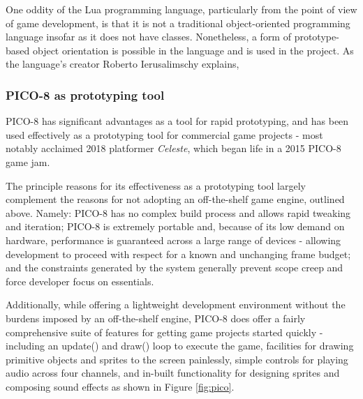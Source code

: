 \documentclass[11pt]{article}
\begin{document}
One oddity of the Lua programming language, particularly from the point of view of
game development, is that it is not a traditional object-oriented programming language
insofar as it does not have classes. Nonetheless, a form of prototype-based object orientation
is possible in the language and is used in the project. As the language's creator Roberto Ierusalimschy
explains\cite[p. 151]{ierusalimschy}, 

\subsubsection*{PICO-8 as prototyping tool}

PICO-8 has significant advantages as a tool for rapid prototyping, and has been used
effectively as a prototyping tool for commercial game projects - most notably
acclaimed 2018 platformer \textit{Celeste}, which began life in a 2015 PICO-8 game jam.

The principle reasons for its effectiveness as a prototyping tool largely complement the
reasons for not adopting an off-the-shelf game engine, outlined above. Namely: PICO-8
has no complex build process and allows rapid tweaking and iteration; PICO-8 is extremely
portable and, because of its low demand on hardware, performance is guaranteed across a large
range of devices - allowing development to proceed with respect for a known and unchanging
frame budget; and the constraints generated by the system generally prevent scope creep and force
developer focus on essentials.

Additionally, while offering a lightweight development environment without the burdens
imposed by an off-the-shelf engine, PICO-8 does offer a fairly comprehensive suite of
features for getting game projects started quickly - including an \textunderscore update()
and \textunderscore draw()
loop to execute the game, facilities for drawing primitive objects and sprites
to the screen painlessly, simple controls for playing audio across four channels, and
in-built functionality for designing sprites and composing sound effects as shown in Figure
\ref{fig:pico}.
\end{document}
